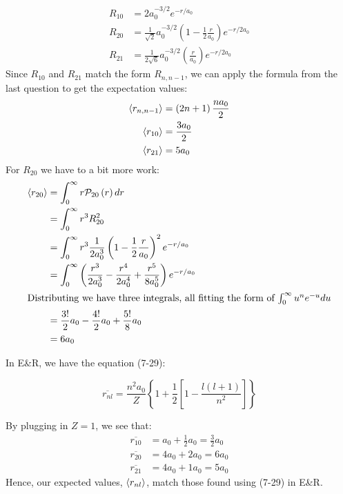 \documentclass[10pt]{article}
\begin{document}
\begin{enumerate}
\begin{align*}
  R_{10} &= 2 a_0 ^{-3/2} e ^ {-r /a_0} \\
  R_{20} &= \frac{1}{\sqrt{2}} a_0^{-3 /2} \left( 1- \frac{1}{2} \frac{r}{a_0} \right) e ^ {-r /2 a_0}\\
  R_{21} &= \frac{1}{2 \sqrt{6}} a_0^{-3 /2} \left( \frac{r}{a_0} \right) e ^ {-r / 2 a_0}
\end{align*}
Since $ R_{10} $ and $ R_{21} $ match the form $ R_{n,n-1} $, we can apply the formula from the last question to get the expectation values:
\begin{align*}
  \braket{r_{n,n-1}} &= \left( 2n+1 \right)\frac{n a_0}{2} \\
  \braket{r_{10}} &= \frac{3 a_0}{2} \\
  \braket{r_{21}} &= 5 a_0
\end{align*}
For $ R_{20} $ we have to a bit more work:
\begin{align*}
  \braket{r_{20}} &= \int_{0}^{\infty} r \mathcal{P}_{20}\left( r \right) dr \\
  &= \int_{0}^{\infty} r^3 R_{20}^2 \\
  &= \int_{0}^{\infty} r^3 \frac{1}{2 a_0^3} \left( 1- \frac{1}{2} \frac{r}{a_0} \right)^2 e ^ {-r/a_0} \\
  &= \int_{0}^{\infty} \left( \frac{r^3}{2a_0^3} - \frac{r^4}{2 a_0^4} + \frac{r^5}{8 a_0^5} \right) e ^ {-r /a_0} \\
  \intertext{\centering Distributing we have three integrals, all fitting the form of $ \int_{0}^{\infty} u^n e ^ {-u}du $}
  &= \frac{3!}{2} a_0 - \frac{4!}{2}a_0 + \frac{5!}{8}a_0 \\
  &= 6 a_0
\end{align*}

In E\&R, we have the equation (7-29):

\begin{equation*}
  \overline{r_{nl}} = \frac{n^2 a_0}{Z} \left\{ 1+\frac{1}{2} \left[ 1- \frac{l \left( l+1 \right)}{n^2} \right]\right\}
\end{equation*}

By plugging in $ Z=1 $, we see that:
\begin{align*}
  \overline{r_{10}} &= a_0 + \frac{1}{2} a_0 = \frac{3}{2} a_0 \\
  \overline{r_{20}} &= 4 a_0 + 2 a_0 = 6 a_0 \\
  \overline{r_{21}} &= 4 a_0 + 1 a_0 = 5 a_0
\end{align*}
Hence, our expected values, $ \braket{r_{nl}} $, match those found using (7-29) in E\&R.


\end{enumerate}
\end{document}
